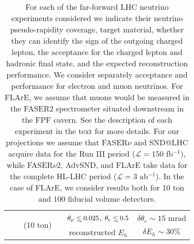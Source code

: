 \begin{table}[t]
\begin{tabularx}{\textwidth}{Xccccc}
&   &  \multirow{2}{*}{(10 ton)}   &   & $\theta_\mu \lsim 0.025$, $\theta_e \lsim 0.5$ &    $\delta \theta_e \sim 15 $ mrad   \\
 &   &     &  & reconstructed $E_h$  &    $\delta E_h \sim 30\% $   \\
  \bottomrule
\end{tabularx}
\vspace{0.2cm}
\caption{\small For each of the far-forward LHC neutrino experiments considered
   we indicate their neutrino pseudo-rapidity coverage, target material, whether
  they can identify the sign of the outgoing charged lepton,
  the acceptance for the charged lepton and hadronic final state,
  and the expected reconstruction performance.
  We consider separately acceptance and performance for electron and muon
  neutrinos.
  For FLArE, we assume that muons would be measured in the FASER2 spectrometer
  situated downstream in the FPF cavern.
  See the description of each experiment in the text for more details.
  For our projections we assume that FASER$\nu$ and SND@LHC acquire data
  for the Run III period ($\mathcal{L}=150$ fb$^{-1}$), while FASER$\nu$2, AdvSND, and FLArE take data
  for the complete HL-LHC period ($\mathcal{L}=3$ ab$^{-1}$).
  In the case of FLArE, we consider results both
  for 10 ton and 100 fiducial volume detectors.
  \label{tab:FPF_experiments}
}
\end{table}

